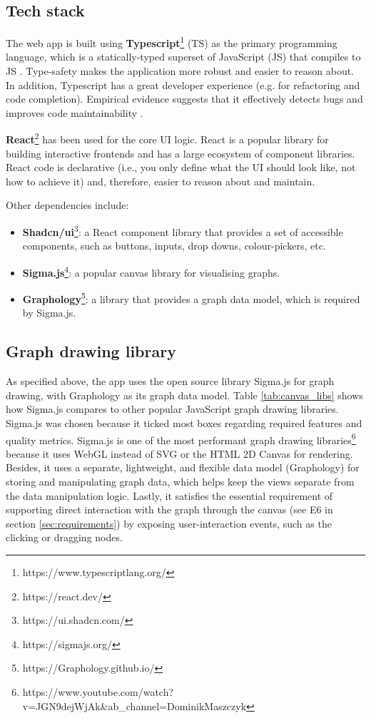 \documentclass{l4proj}
\begin{document}
\subsection{Tech stack}
\label{sec:tech_stack}

The web app is built using \textbf{Typescript}\footnote{https://www.typescriptlang.org/} (TS) as the primary programming language, which is a statically-typed superset of JavaScript (JS) that compiles to JS \citep{typescript}. Type-safety makes the application more robust and easier to reason about. In addition, Typescript has a great developer experience (e.g. for refactoring and code completion). Empirical evidence suggests that it effectively detects bugs and improves code maintainability \citep{typescript_bugs_paper}.

\textbf{React}\footnote{https://react.dev/} has been used for the core UI logic. React is a popular library for building interactive frontends and has a large ecosystem of component libraries. React code is declarative (i.e., you only define what the UI should look like, not how to achieve it) and, therefore, easier to reason about and maintain.

Other dependencies include:
\begin{itemize}
    \item \textbf{Shadcn/ui}\footnote{https://ui.shadcn.com/}: a React component library that provides a set of accessible components, such as buttons, inputs, drop downs, colour-pickers, etc.
    \item \textbf{Sigma.js}\footnote{https://sigmajs.org/}: a popular canvas library for visualising graphs.
    \item \textbf{Graphology}\footnote{https://Graphology.github.io/}: a library that provides a graph data model, which is required by Sigma.js.
\end{itemize}



\subsection{Graph drawing library}
As specified above, the app uses the open source library Sigma.js for graph drawing, with Graphology as its graph data model. Table \ref{tab:canvas_libs} shows how Sigma.js compares to other popular JavaScript graph drawing libraries. Sigma.js was chosen because it ticked most boxes regarding required features and quality metrics.
Sigma.js is one of the most performant graph drawing libraries\footnote{https://www.youtube.com/watch?v=JGN9dejWjAk\&ab\_channel=DominikMaszczyk} because it uses WebGL instead of SVG or the HTML 2D Canvas for rendering. Besides, it uses a separate, lightweight, and flexible data model (Graphology) for storing and manipulating graph data, which helps keep the views separate from the data manipulation logic.
Lastly, it satisfies the essential requirement of supporting direct interaction with the graph through the canvas (see E6 in section \ref{sec:requirements}) by exposing user-interaction events, such as the clicking or dragging nodes.
\end{document}
